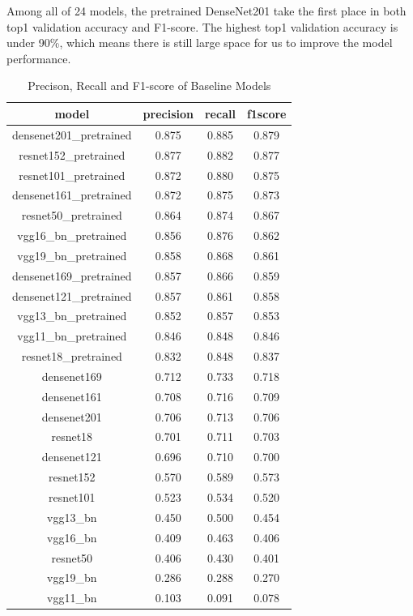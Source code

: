 Among all of 24 models, the pretrained DenseNet201 take the first place in both top1 validation accuracy and F1-score. The highest top1 validation accuracy is under 90\%, which means there is still large space for us to improve the model performance.

\begin{table}[H]
  \centering
  \caption{Precison, Recall and F1-score of Baseline Models}
  \label{tabel:f1}
  \begin{tabular}{cccc}
    \hline
    \toprule
    model                   & precision & recall & f1score \\
    \midrule  %


    densenet201\_pretrained & 0.875     & 0.885  & 0.879   \\
    resnet152\_pretrained   & 0.877     & 0.882  & 0.877   \\
    resnet101\_pretrained   & 0.872     & 0.880  & 0.875   \\
    densenet161\_pretrained & 0.872     & 0.875  & 0.873   \\
    resnet50\_pretrained    & 0.864     & 0.874  & 0.867   \\
    vgg16\_bn\_pretrained   & 0.856     & 0.876  & 0.862   \\
    vgg19\_bn\_pretrained   & 0.858     & 0.868  & 0.861   \\
    densenet169\_pretrained & 0.857     & 0.866  & 0.859   \\
    densenet121\_pretrained & 0.857     & 0.861  & 0.858   \\
    vgg13\_bn\_pretrained   & 0.852     & 0.857  & 0.853   \\
    vgg11\_bn\_pretrained   & 0.846     & 0.848  & 0.846   \\
    resnet18\_pretrained    & 0.832     & 0.848  & 0.837   \\
    densenet169             & 0.712     & 0.733  & 0.718   \\
    densenet161             & 0.708     & 0.716  & 0.709   \\
    densenet201             & 0.706     & 0.713  & 0.706   \\
    resnet18                & 0.701     & 0.711  & 0.703   \\
    densenet121             & 0.696     & 0.710  & 0.700   \\
    resnet152               & 0.570     & 0.589  & 0.573   \\
    resnet101               & 0.523     & 0.534  & 0.520   \\
    vgg13\_bn               & 0.450     & 0.500  & 0.454   \\
    vgg16\_bn               & 0.409     & 0.463  & 0.406   \\
    resnet50                & 0.406     & 0.430  & 0.401   \\
    vgg19\_bn               & 0.286     & 0.288  & 0.270   \\
    vgg11\_bn               & 0.103     & 0.091  & 0.078   \\
    \bottomrule
  \end{tabular}
\end{table}

